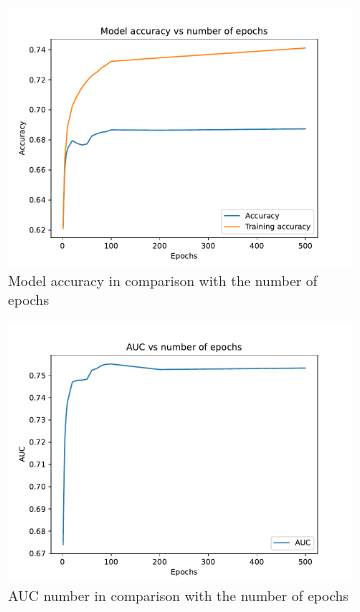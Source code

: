 \documentclass[12pt, a4paper]{article}
\begin{document}
\begin{figure}[H]
  \begin{subfigure}{0.5\textwidth}
  \includegraphics[width=\linewidth]{../graphs/epochs_accuracy.pdf}
  \caption{Model accuracy in comparison with the number of epochs} \label{fig:a}
  \end{subfigure}
  \hspace*{\fill}
  \begin{subfigure}{0.5\textwidth}
  \includegraphics[width=\linewidth]{../graphs/epochs_auc.pdf}
  \caption{AUC number in comparison with the number of epochs} \label{fig:b}
  \end{subfigure}
  \medskip
  \begin{subfigure}{0.5\textwidth}

\end{subfigure}
\end{figure}
\end{document}
